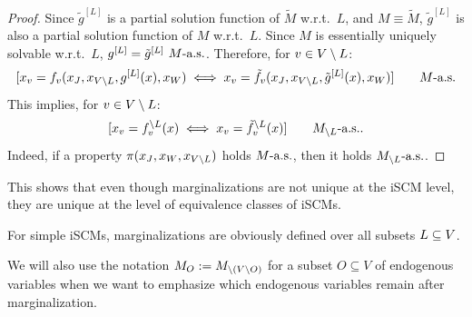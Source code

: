 \begin{proof}
  Since $\tilde{g}^{[L]}$ is a partial solution function of $\tilde{M}$ w.r.t.\ $L$, and $M \equiv \tilde{M}$, $\tilde{g}^{[L]}$ is also a partial solution function of $M$ w.r.t.\ $L$.
  Since $M$ is essentially uniquely solvable w.r.t.\ $L$, $g^{[L]} = \tilde{g}^{[L]}\ M\text{-a.s.}$.
  Therefore, for $v \in V\setminus L$:
  $$[x_v = f_v(x_J,x_{V\setminus L},g^{[L]}(x),x_W) \iff x_v = \tilde{f}_v(x_J,x_{V\setminus L},\tilde{g}^{[L]}(x),x_W)] \qquad M\text{-a.s.}$$
  This implies, for $v \in V\setminus L$:
  $$[x_v = f^{\setminus L}_v(x) \iff x_v = \tilde{f}^{\setminus L}_v(x)] \qquad M_{\setminus L}\text{-a.s.}.$$
  Indeed, if a property $\pi(x_J,x_W,x_{V\setminus L})$ holds $M\text{-a.s.}$, then it holds $M_{\setminus L}\text{-a.s.}$.
\end{proof}
This shows that even though marginalizations are not unique at the iSCM level, they are unique at the level of equivalence classes of iSCMs.

For simple iSCMs, marginalizations are obviously defined over all subsets $L \subseteq V$.
\begin{Not}\label{not:scm_marginalization}
  We will also use the notation $M_O := M_{\setminus (V \setminus O)}$ for a subset $O \subseteq V$ of endogenous variables
  when we want to emphasize which endogenous variables remain after marginalization.
\end{Not}

